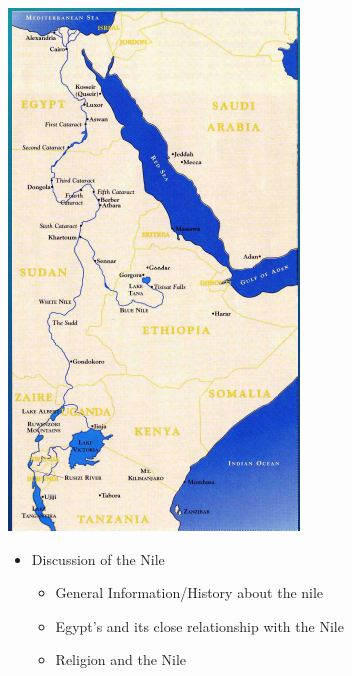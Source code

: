 \documentclass[11pt]{article}
\begin{document}
\includegraphics[width=.9\linewidth]{img/ancNile.png}

\begin{itemize}
\item Discussion of the Nile
\begin{itemize}
\item General Information/History about the nile
\item Egypt's and its close relationship with the Nile
\item Religion and the Nile
\end{itemize}
\end{itemize}
\end{document}
